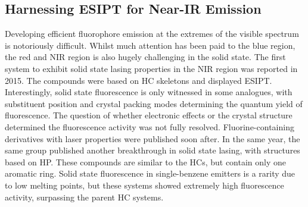 \subsection{Harnessing ESIPT for Near-IR Emission}
Developing efficient fluorophore emission at the extremes of the visible spectrum is notoriously difficult. Whilst much attention has been paid to the blue region, the red and \ac{NIR} region is also hugely challenging in the solid state. The first system to exhibit solid state lasing properties in the \ac{NIR} region was reported in 2015.\cite{Cheng2015} The compounds were based on \ac{HC} skeletons and displayed \ac{ESIPT}. Interestingly, solid state fluorescence is only witnessed in some analogues, with substituent position and crystal packing modes determining the quantum yield of fluorescence. The question of whether electronic effects or the crystal structure determined the fluorescence activity was not fully resolved. Fluorine-containing derivatives with laser properties were published soon after.\cite{Cheng2016} In the same year, the same group published another breakthrough in solid state lasing, with structures based on  \ac{HP}.\cite{Tang2016} These compounds are similar to the \acp{HC}, but contain only one aromatic ring. Solid state fluorescence in single-benzene emitters is a rarity due to low melting points, but these systems showed extremely high fluorescence activity, surpassing the parent \ac{HC} systems.

